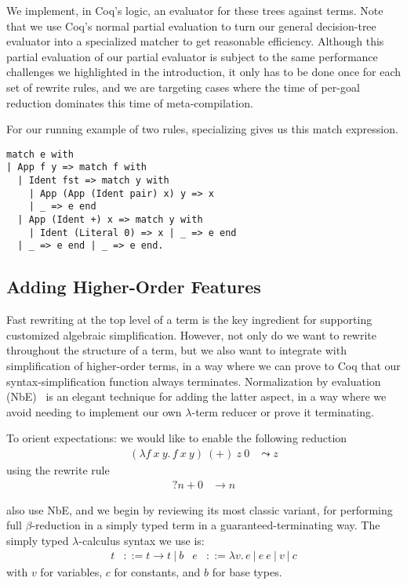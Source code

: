 \documentclass[sigplan,10pt,review,anonymous]{acmart}\settopmatter{printfolios=true,printccs=false,printacmref=false}
\begin{document}
We implement, in Coq's logic, an evaluator for these trees against terms.
Note that we use Coq's normal partial evaluation to turn our general decision-tree evaluator into a specialized matcher to get reasonable efficiency.
Although this partial evaluation of our partial evaluator is subject to the same performance challenges we highlighted in the introduction, it only has to be done once for each set of rewrite rules, and we are targeting cases where the time of per-goal reduction dominates this time of meta-compilation.

For our running example of two rules, specializing gives us this match expression.
\begin{verbatim}
match e with
| App f y => match f with
  | Ident fst => match y with
    | App (App (Ident pair) x) y => x
    | _ => e end
  | App (Ident +) x => match y with
    | Ident (Literal 0) => x | _ => e end
  | _ => e end | _ => e end.
\end{verbatim}

\subsection{Adding Higher-Order Features} \label{sec:thunk-eval-subst-term}

Fast rewriting at the top level of a term is the key ingredient for supporting customized algebraic simplification.
However, not only do we want to rewrite throughout the structure of a term, but we also want to integrate with simplification of higher-order terms, in a way where we can prove to Coq that our syntax-simplification function always terminates.
Normalization by evaluation (NbE)~\cite{NbE} is an elegant technique for adding the latter aspect, in a way where we avoid needing to implement our own $\lambda$-term reducer or prove it terminating.

To orient expectations: we would like to enable the following reduction
\begin{align*}
  (\lambda f\ x\ y.\, f\ x\ y)\ (+)\ z\ 0 & \leadsto z
\end{align*}
\noindent using the rewrite rule
\begin{align*}
  ?n + 0 & \to n
\end{align*}

\citet{Aehlig} also use NbE, and we begin by reviewing its most classic variant, for performing full $\beta$-reduction in a simply typed term in a guaranteed-terminating way.
The simply typed $\lambda$-calculus syntax we use is:
\begin{align*}
  t & ::= t \to t ~|~ b
  & e & ::= \lambda v.\, e ~|~ e~e ~|~ v ~|~ c
\end{align*}
\noindent with $v$ for variables, $c$ for constants, and $b$ for base types.
\end{document}
